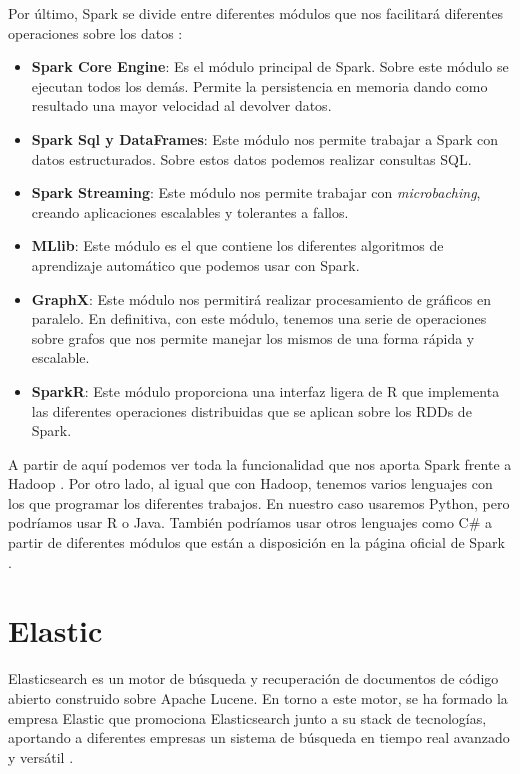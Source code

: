 Por último, Spark se divide entre diferentes módulos que nos facilitará
diferentes operaciones sobre los datos \cite{Spk-3}:

\begin{itemize}
\item \textbf{Spark Core Engine}: Es el módulo principal de Spark. Sobre
  este módulo se ejecutan todos los demás. Permite la persistencia en
  memoria dando como resultado una mayor velocidad al devolver datos.
\item \textbf{Spark Sql y DataFrames}: Este módulo nos permite trabajar a
  Spark con datos estructurados. Sobre estos datos podemos realizar
  consultas SQL.
\item \textbf{Spark Streaming}: Este módulo nos permite trabajar con {\em
    microbaching}, creando aplicaciones escalables y tolerantes a fallos.
\item \textbf{MLlib}: Este módulo es el que contiene los diferentes
  algoritmos de aprendizaje automático que podemos usar con Spark.
\item \textbf{GraphX}: Este módulo nos permitirá realizar procesamiento de
  gráficos en paralelo. En definitiva, con este módulo, tenemos una serie
  de operaciones sobre grafos que nos permite manejar los mismos de una
  forma rápida y escalable.
\item \textbf{SparkR}: Este módulo proporciona una interfaz ligera de R que
  implementa las diferentes operaciones distribuidas que se aplican sobre
  los RDDs de Spark.
\end{itemize}

A partir de aquí podemos ver toda la funcionalidad que nos aporta Spark
frente a Hadoop \cite{Spk-7}. Por otro lado, al igual que con Hadoop,
tenemos varios lenguajes con los que programar los diferentes trabajos. En
nuestro caso usaremos Python, pero podríamos usar R o Java. También
podríamos usar otros lenguajes como C\# a partir de diferentes módulos que
están a disposición en la página oficial de Spark \cite{Spk-6}.


\section{Elastic\label{Elastic}}

Elasticsearch es un motor de búsqueda y recuperación de documentos de
código abierto construido sobre Apache Lucene. En torno a este motor, se ha
formado la empresa Elastic que promociona Elasticsearch junto a su stack de
tecnologías, aportando a diferentes empresas un sistema de búsqueda en
tiempo real avanzado y versátil \cite{Elk-1}.

